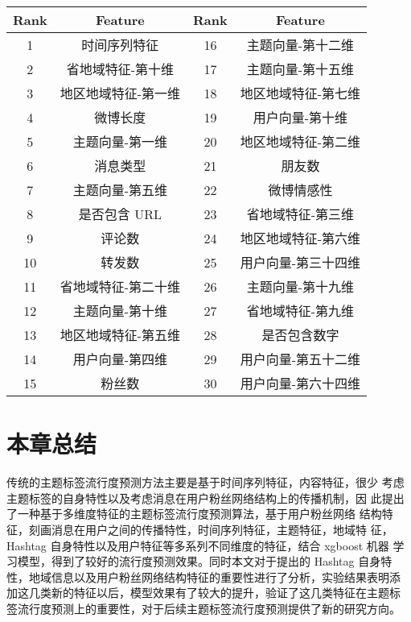\begin{table}[H]
    \centering
    \footnotesize%
      \label{tab:3_9}
    \setlength{\tabcolsep}{15pt}%
    \renewcommand{\arraystretch}{1.2}%
    \begin{tabular}{cccc}
        \hline
        \textbf{Rank} &  \textbf{Feature} &\textbf{ Rank} & \textbf{Feature}  \\
        \hline

       1 & 时间序列特征 & 16 & 主题向量-第十二维 \\
       2 &省地域特征-第十维& 17& 主题向量-第十五维 \\
       3 &地区地域特征-第一维 & 18 &地区地域特征-第七维\\
      4 & 微博长度 &19 &  用户向量-第十维\\
       5 & 主题向量-第一维 &20 &    地区地域特征-第二维\\
       6 & 消息类型 &21 & 朋友数   \\
       7 & 主题向量-第五维 &22& 微博情感性\\
        8&      是否包含 URL &23 &   省地域特征-第三维 \\
             9&评论数 &24 & 地区地域特征-第六维  \\
       10 &       转发数 & 25 & 用户向量-第三十四维  \\
             11 &省地域特征-第二十维 &26 & 主题向量-第十九维 \\
       12 &       主题向量-第十维 &27 & 省地域特征-第九维 \\
       13&地区地域特征-第五维 &28 & 是否包含数字    \\
          14 &用户向量-第四维 &29 & 用户向量-第五十二维  \\
            15 & 粉丝数 &30 & 用户向量-第六十四维    \\



      
      
        	\hline
    \end{tabular}

\end{table}


\section{本章总结}
传统的主题标签流行度预测方法主要是基于时间序列特征，内容特征，很少 考虑主题标签的自身特性以及考虑消息在用户粉丝网络结构上的传播机制，因 此提出了一种基于多维度特征的主题标签流行度预测算法，基于用户粉丝网络 结构特征，刻画消息在用户之间的传播特性，时间序列特征，主题特征，地域特 征，Hashtag 自身特性以及用户特征等多系列不同维度的特征，结合 xgboost 机器 学习模型，得到了较好的流行度预测效果。同时本文对于提出的 Hashtag 自身特 性，地域信息以及用户粉丝网络结构特征的重要性进行了分析，实验结果表明添 加这几类新的特征以后，模型效果有了较大的提升，验证了这几类特征在主题标 签流行度预测上的重要性，对于后续主题标签流行度预测提供了新的研究方向。

